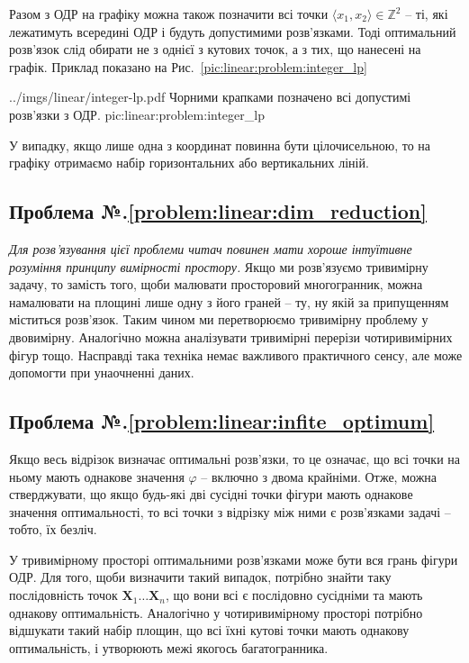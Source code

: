 \documentclass[\main/book.tex]{subfiles}
\begin{document}
Разом з ОДР на графіку можна також позначити всі точки $\langle x_1, x_2 \rangle \in \mathbb{Z}^2$ -- ті, які лежатимуть всередині ОДР і будуть допустимими розв'язками. Тоді оптимальний розв'язок слід обирати не з однієї з кутових точок, а з тих, що нанесені на графік. Приклад показано на Рис.~\ref{pic:linear:problem:integer_lp}

\illustration
 {../imgs/linear/integer-lp.pdf}
 {Чорними крапками позначено всі допустимі розв'язки з ОДР.}
 {pic:linear:problem:integer_lp}

У випадку, якщо лише одна з координат повинна бути цілочисельною, то на графіку отримаємо набір горизонтальних або вертикальних ліній.

\subsection*{Проблема №.\ref{problem:linear:dim_reduction}}

\textit{Для розв'язування цієї проблеми читач повинен мати хороше інтуїтивне розуміння принципу вимірності простору.} Якщо ми розв'язуємо тривимірну задачу, то замість того, щоби малювати просторовий многогранник, можна намалювати на площині лише одну з його граней -- ту, ну якій за припущенням міститься розв'язок. Таким чином ми перетворюємо тривимірну проблему у двовимірну. Аналогічно можна аналізувати тривимірні перерізи чотиривимірних фігур тощо. Насправді така техніка немає важливого практичного сенсу, але може допомогти при унаочненні даних.

\subsection*{Проблема №.\ref{problem:linear:infite_optimum}}

Якщо весь відрізок визначає оптимальні розв'язки, то це означає, що всі точки на ньому мають однакове значення $\varphi$ -- включно з двома крайніми. Отже, можна стверджувати, що якщо будь-які дві сусідні точки фігури мають однакове значення оптимальності, то всі точки з відрізку між ними є розв'язками задачі -- тобто, їх безліч.

У тривимірному просторі оптимальними розв'язками може бути вся грань фігури ОДР. Для того, щоби визначити такий випадок, потрібно знайти таку послідовність точок $\mathbf{X}_1 \ldots \mathbf{X}_n$, що вони всі є послідовно сусідніми та мають однакову оптимальність. Аналогічно у чотиривимірному просторі потрібно відшукати такий набір площин, що всі їхні кутові точки мають однакову оптимальність, і утворюють межі якогось багатогранника.
\end{document}
